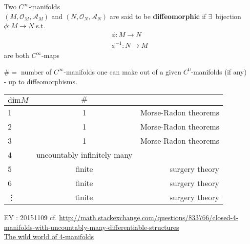 \begin{definition}
  Two $C^{\infty}$-manifolds \\
  $(M,\mathcal{O}_M, \mathcal{A}_M)$ and $(N,\mathcal{O}_N, \mathcal{A}_N)$ are said to be \textbf{diffeomorphic} if $\exists \, $ bijection $\phi : M \to N$ s.t. 
\[
\begin{aligned} & \phi : M \to N \\
  & \phi^{-1} : N \to M \end{aligned}
    \]
are both $C^{\infty}$-maps



\end{definition}

\begin{theorem}
  $\# = $ number of $C^{\infty}$-manifolds one can make out of a given $C^0$-manifolds (if any) - up to diffeomorphisms.  

\begin{tabular}{l | c r }
  $\text{dim}M$ &  $\#$ &  \\
  \hline
  1  & 1  & Morse-Radon theorems \\
 2  & 1  & Morse-Radon theorems \\
 3 & 1  & Morse-Radon theorems \\
4 & uncountably infinitely many & \\
5 &   finite  & surgery theory \\
6 &  finite & surgery theory \\
\vdots & finite & surgery theory
\end{tabular}

\end{theorem}

EY : 20151109 cf. \url{http://math.stackexchange.com/questions/833766/closed-4-manifolds-with-uncountably-many-differentiable-structures}  \\
\href{http://www.maths.ed.ac.uk/~aar/papers/scorpan.pdf}{The wild world of 4-manifolds}
